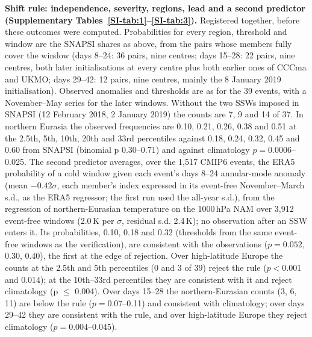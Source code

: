 \documentclass[11pt]{article}
\begin{document}
\textbf{Shift rule: independence, severity, regions, lead and a second predictor (Supplementary Tables~\ref{SI-tab:1}--\ref{SI-tab:3}).} Registered together, before these outcomes were computed. Probabilities for every region, threshold and window are the SNAPSI shares as above, from the pairs whose members fully cover the window (days 8–24: 36 pairs, nine centres; days 15–28: 22 pairs, nine centres, both later initialisations at every centre plus both earlier ones of CCCma and UKMO; days 29–42: 12 pairs, nine centres, mainly the 8 January 2019 initialisation). Observed anomalies and thresholds are as for the 39 events, with a November–May series for the later windows. Without the two SSWs imposed in SNAPSI (12 February 2018, 2 January 2019) the counts are 7, 9 and 14 of 37. In northern Eurasia the observed frequencies are 0.10, 0.21, 0.26, 0.38 and 0.51 at the 2.5th, 5th, 10th, 20th and 33rd percentiles against 0.18, 0.24, 0.32, 0.45 and 0.60 from SNAPSI (binomial p 0.30–0.71) and against climatology $p = 0.0006$–0.025. The second predictor averages, over the 1,517 CMIP6 events, the ERA5 probability of a cold window given each event's days 8–24 annular-mode anomaly (mean $-0.42\sigma$, each member's index expressed in its event-free November–March s.d., as the ERA5 regressor; the first run used the all-year s.d.), from the regression of northern-Eurasian temperature on the 1000\,hPa NAM over 3,912 event-free windows (2.0\,K per $\sigma$, residual s.d. 2.4\,K); no observation after an SSW enters it. Its probabilities, 0.10, 0.18 and 0.32 (thresholds from the same event-free windows as the verification), are consistent with the observations ($p = 0.052,$ 0.30, 0.40), the first at the edge of rejection. Over high-latitude Europe the counts at the 2.5th and 5th percentiles (0 and 3 of 39) reject the rule ($p < 0.001$ and 0.014); at the 10th–33rd percentiles they are consistent with it and reject climatology (p $\le$ 0.004). Over days 15–28 the northern-Eurasian counts (3, 6, 11) are below the rule ($p = 0.07$–0.11) and consistent with climatology; over days 29–42 they are consistent with the rule, and over high-latitude Europe they reject climatology ($p = 0.004$–0.045).
\end{document}
